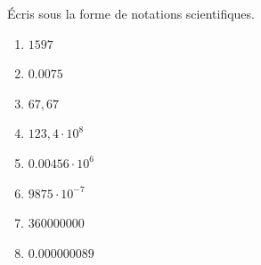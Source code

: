 %
%
  Écris sous la forme de notations scientifiques.
  \begin{enumerate}[cols=2]
    \item $\num{1597}$
    \item $\num{0,0075}$
    \item $67,67$
    \item $123,4 \cdot 10^{8}$
    \item $\num{0.00456}\cdot 10^6$
    \item $\num{9875} \cdot 10^{- 7}$
    \item $\num{360000000}$
    \item $\num{0,000000089}$
  \end{enumerate}
